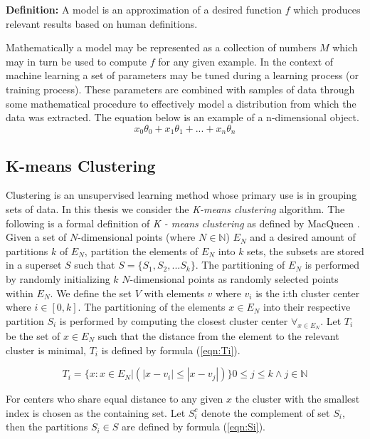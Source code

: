 \textbf{Definition: } A model is an approximation of a desired function $f$ which produces relevant results based on human definitions.  

\vspace{5mm}

Mathematically a model may be represented as a collection of numbers $M$ which may in turn be used to compute $f$ for any given example.
In the context of machine learning a set of parameters may be tuned during a learning process (or training process). These parameters are combined with samples of data through some mathematical procedure to effectively model a distribution from which the data was extracted. The equation below is an example of a n-dimensional object.
$$x_0\theta_0 + x_1\theta_1 + ... + x_n\theta_n$$

\subsection{K-means Clustering}

Clustering is an unsupervised learning method whose primary use is in grouping sets of data. In this thesis we consider the \textit{K-means clustering} algorithm. The following is a formal definition of \textit{K - means clustering} as defined by MacQueen \cite{macqueen}. Given a set of $N$-dimensional points (where $N \in \mathbb{N}$) $E_N$ and a desired amount of partitions $k$ of $E_N$, partition the elements of $E_N$ into $k$ sets, the subsets are stored in a superset $S$ such that $S = \{S_1, S_2, ... S_k\}$. The partitioning of $E_N$ is performed by randomly initializing $k$  $N$-dimensional points as randomly selected points within $E_N$. We define the set $V$ with elements $v$ where $v_i$ is the i:th cluster center where $i \in [0, k]$. The partitioning of the elements $x \in E_N$ into their respective partition $S_i$ is performed by computing the closest cluster center $\forall_{x \in E_N}$. Let $T_i$ be the set of $x \in E_N$ such that the distance from the element to the relevant cluster is minimal, $T_i$ is defined by formula (\ref{eqn:Ti}).

\begin{equation}
\label{eqn:Ti}
T_i = \{x : x \in E_N | (|x - v_i| \leq |x - v_j|)\}  0 \leq j \leq k \wedge j \in \mathbb{N} 
\end{equation}

For centers who share equal distance to any given $x$ the cluster with the smallest index is chosen as the containing set. Let $S_i^c$ denote the complement of set $S_i$, then the partitions $S_i \in S$ are defined by formula (\ref{eqn:Si}).

